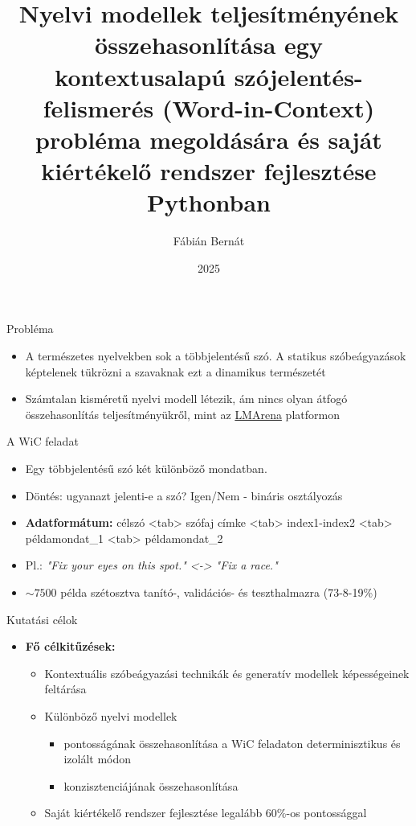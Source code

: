 \documentclass{beamer}
\title{\bf Nyelvi modellek teljesítményének összehasonlítása egy kontextusalapú szójelentés-felismerés (Word-in-Context) probléma megoldására és saját kiértékelő rendszer fejlesztése Pythonban}
\author{Fábián Bernát}
\institute{Programtervező Informatikus BSc\\Szegedi Tudományegyetem}
\date{2025}
\begin{document}
    \frame{\titlepage}

    \begin{frame}{Probléma}
        \begin{itemize}
            \item A természetes nyelvekben sok a többjelentésű szó. A statikus szóbeágyazások képtelenek tükrözni a szavaknak ezt a dinamikus természetét
            \item Számtalan kisméretű nyelvi modell létezik, ám nincs olyan átfogó összehasonlítás teljesítményükről, mint az \href{https://lmarena.ai/}{LMArena} platformon
        \end{itemize}
    \end{frame}

    \begin{frame}{A WiC feladat}
        \begin{itemize}

            \item Egy többjelentésű szó két különböző mondatban.
            \item Döntés: ugyanazt jelenti-e a szó? Igen/Nem - bináris osztályozás
            \item \textbf{Adatformátum:} célszó <tab> szófaj címke <tab> index1-index2 <tab> példamondat\_1 <tab> példamondat\_2
            \item Pl.: \textit{"Fix your eyes on this spot." <-> "Fix a race."}
            \item $\sim7500$ példa szétosztva tanító-, validációs- és teszthalmazra (73-8-19\%)
        \end{itemize}
    \end{frame}


    \begin{frame}{Kutatási célok}
        \begin{itemize}
            \item \textbf{Fő célkitűzések:}
            \begin{itemize}
                \item Kontextuális szóbeágyazási technikák és generatív modellek képességeinek feltárása
                \item Különböző nyelvi modellek
                \begin{itemize}
                    \item pontosságának összehasonlítása a WiC feladaton determinisztikus és izolált módon
                    \item konzisztenciájának összehasonlítása
                \end{itemize}
                \item Saját kiértékelő rendszer fejlesztése legalább 60\%-os pontossággal
            \end{itemize}
        \end{itemize}
    \end{frame}
\end{document}
